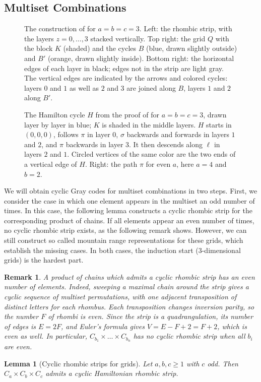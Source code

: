 \documentclass[fontsize=11pt,a4paper,DIV=12]{scrartcl}
\newtheorem{remark}[theorem]{Remark}
\newtheorem{lemma}[theorem]{Lemma}
\begin{document}
\subsection{Multiset Combinations}
\begin{figure}
	\centering
	
	\caption{The construction of  for $a=b=c=3$. Left: the rhombic strip, with the layers $z=0,\ldots,3$ stacked vertically. Top right: the grid $Q$ with the block $K$ (shaded) and the cycles $B$ (blue, drawn slightly outside) and $B'$ (orange, drawn slightly inside). Bottom right: the horizontal edges of each layer in black; edges not in the strip are light gray. The vertical edges are indicated by the arrows and colored cycles: layers $0$ and $1$ as well as $2$ and $3$ are joined along $B$, layers $1$ and $2$ along $B'$.}
	\label{fig:3dgrid}
\end{figure}
\begin{figure}
	\centering
	
	\caption{The Hamilton cycle $H$ from the proof of  for $a=b=c=3$, drawn layer by layer in blue; $K$ is shaded in the middle layers. $H$ starts in $(0,0,0)$, follows $\pi$ in layer $0$, $\sigma$ backwards and forwards in layers $1$ and $2$, and $\pi$ backwards in layer $3$. It then descends along $\ell$ in layers $2$ and $1$. Circled vertices of the same color are the two ends of a vertical edge of $H$. Right: the path $\pi$ for even $a$, here $a=4$ and $b=2$.}
	\label{fig:3dgrid ham}
\end{figure}
We will obtain cyclic Gray codes for multiset combinations in two steps. First, we consider the case in which one element appears in the multiset an odd number of times. In this case, the following lemma constructs a cyclic rhombic strip for the corresponding product of chains. If all elements appear an even number of times, no cyclic rhombic strip exists, as the following remark shows. However, we can still construct so called mountain range representations for these grids, which establish the missing cases. In both cases, the induction start (3-dimensional grids) is the hardest part.

\begin{remark}\label{rem:grid-parity}
	A product of chains which admits a cyclic rhombic strip has an even number of elements. Indeed, sweeping a maximal chain around the strip gives a cyclic sequence of multiset permutations, with one adjacent transposition of distinct letters for each rhombus. Each transposition changes inversion parity, so the number $F$ of rhombi is even. Since the strip is a quadrangulation, its number of edges is $E=2F$, and Euler's formula gives $V=E-F+2=F+2$, which is even as well. In particular, $C_{b_1}\times\ldots\times C_{b_n}$ has no cyclic rhombic strip when all $b_i$ are even.
\end{remark}
\begin{lemma}[Cyclic rhombic strips for grids]
	\label{lem:cyclic-grid-seed}
	Let $a,b,c \geq 1$ with $c$ odd. Then $C_a \times C_b \times C_c$ admits a
	cyclic Hamiltonian rhombic strip.
\end{lemma}
\end{document}
